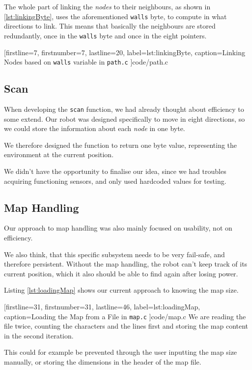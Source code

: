 The whole part of linking the \emph{nodes} to their neighbours,
as shown in \ref{lst:linkingByte},
uses the aforementioned {\tt walls} byte,
to compute in what directions to link.
This means that basically the neighbours are stored redundantly,
once in the {\tt walls} byte and once in the eight pointers.


[firstline=7,				%
firstnumber=7,
lastline=20,
label=lst:linkingByte,	%
caption={Linking Nodes based on {\tt walls} variable in {\tt path.c}}
]{code/path.c}
%

\subsection{Scan}
When developing the {\tt scan} function,
we had already thought about efficiency to some extend.
Our robot was designed specifically to move in eight directions,
so we could store the information about each \emph{node} in one byte.

We therefore designed the function to return one byte value,
representing the environment at the current position.

We didn't have the opportunity to finalise our idea,
since we had troubles acquiring functioning sensors,
and only used hardcoded values for testing.

\subsection{Map Handling}
Our approach to map handling was also mainly focused on usability,
not on efficiency.

We also think, that this specific subsystem needs to be very fail-safe,
and therefore persistent.
Without the map handling,
the robot can't keep track of its current position,
which it also should be able to find again after losing power.

Listing \ref{lst:loadingMap} shows our current approach to knowing the map size.


[firstline=31,				%
firstnumber=31,
lastline=46,
label=lst:loadingMap,	%
caption={Loading the Map from a File in {\tt map.c}}
]{code/map.c}
%
We are reading the file twice,
counting the characters and the lines first and storing the map content in the second iteration.

This could for example be prevented through the user inputting the map size manually,
or storing the dimensions in the header of the map file.

